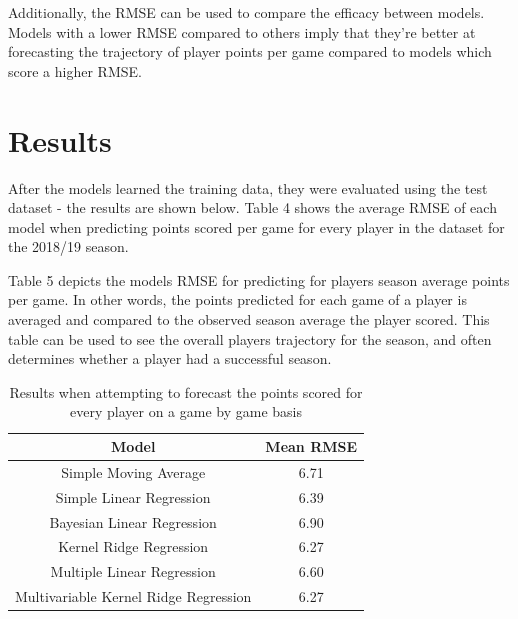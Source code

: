 \documentclass[a4paper,11pt,twoside]{article}
\begin{document}
Additionally, the RMSE can be used to compare the efficacy between models. Models with a lower RMSE compared to others imply that they're better at forecasting the trajectory of player points per game compared to models which score a higher RMSE.


\newpage

\section{Results}

After the models learned the training data, they were evaluated using the test dataset - the results are shown below. Table 4 shows the average RMSE of each model when predicting points scored per game for every player in the dataset for the 2018/19 season.

Table 5 depicts the models RMSE for predicting for players season average points per game. In other words, the points predicted for each game of a player is averaged and compared to the observed season average the player scored. This table can be used to see the overall players trajectory for the season, and often determines whether a player had a successful season.
\vspace{5mm}
\begin{table} [h!]
\captionsetup{justification=centering}
\begin{center}
\begin{tabular}{ |c|c|} 
 \hline
 \textbf{Model} & \textbf{Mean RMSE}\\ 
 \hline
 Simple Moving Average &  6.71\\ 
 \hline
 Simple Linear Regression &  6.39\\ 
 \hline
 Bayesian Linear Regression& 6.90\\
 \hline
 Kernel Ridge Regression& 6.27\\
 \hline
 Multiple Linear Regression& 6.60\\
 \hline
 Multivariable Kernel Ridge Regression & 6.27\\
 \hline
\end{tabular}
\end{center}
\caption{Results when attempting to forecast the points scored for every player on a game by game basis}
\end{table}
\end{document}
